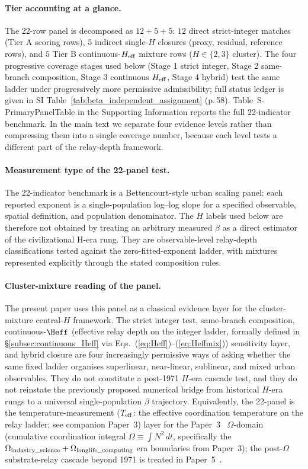 \paragraph{Tier accounting at a glance.} The 22-row panel is decomposed as \(12 + 5 + 5\): \(12\) direct strict-integer matches (Tier A scoring rows), \(5\) indirect single-\(H\) closures (proxy, residual, reference rows), and \(5\) Tier B continuous-\(H_{\rm eff}\) mixture rows (\(H{\in}\{2,3\}\) cluster). The four progressive coverage stages used below (Stage 1 strict integer, Stage 2 same-branch composition, Stage 3 continuous \(H_{\rm eff}\), Stage 4 hybrid) test the same ladder under progressively more permissive admissibility; full status ledger is given in SI Table~\ref{tab:beta_independent_assignment} (p.\,58).
Table~\textsf{S-PrimaryPanelTable} in the Supporting Information reports the
full 22-indicator benchmark. In the main text we separate four evidence levels
rather than compressing them into a single coverage number, because each level
tests a different part of the relay-depth framework.

\paragraph{Measurement type of the 22-panel test.}
The 22-indicator benchmark is a Bettencourt-style urban scaling panel: each reported exponent is a single-population log--log slope for a specified observable, spatial definition, and population denominator. The \(H\) labels used below are therefore not obtained by treating an arbitrary measured \(\beta\) as a direct estimator of the civilizational H-era rung. They are observable-level relay-depth classifications tested against the zero-fitted-exponent ladder, with mixtures represented explicitly through the stated composition rules.

\paragraph{Cluster-mixture reading of the panel.}
The present paper uses this panel as a classical evidence layer for the cluster-mixture central-\(H\) framework. The strict integer test, same-branch composition, continuous-\(\Heff\) (effective relay depth on the integer ladder, formally defined in \S\ref{subsec:continuous_Heff} via Eqs.~(\ref{eq:Heff})--(\ref{eq:Heffmix})) sensitivity layer, and hybrid closure are four increasingly permissive ways of asking whether the same fixed ladder organises superlinear, near-linear, sublinear, and mixed urban observables. They do not constitute a post-1971 \(H\)-era cascade test, and they do not reinstate the previously proposed numerical bridge from historical \(H\)-era rungs to a universal single-population \(\beta\) trajectory. Equivalently, the 22-panel is the temperature-measurement (\(T_{\rm eff}\): the effective coordination temperature on the relay ladder; see companion Paper~3) layer for the Paper~3~\cite{Kato2026c} \(\Omega\)-domain (cumulative coordination integral \(\Omega\equiv\int N^{2}\,dt\), specifically the \(\Omega_{\rm industry\_science}+\Omega_{\rm longlife\_computing}\) era boundaries from Paper~3); the post-\(\Omega\) substrate-relay cascade beyond 1971 is treated in Paper~5~\cite{Kato2026e}.

